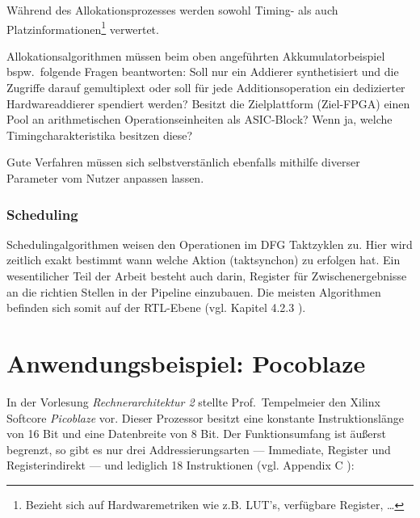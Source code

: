 \documentclass[oneside,a4paper]{article}
\begin{document}
Während des Allokationsprozesses werden sowohl Timing- als auch
Platzinformationen\footnote{Bezieht sich auf Hardwaremetriken wie z.B. LUT's, verfügbare Register, \ldots}
verwertet.

Allokationsalgorithmen müssen beim oben angeführten Akkumulatorbeispiel
bspw.\ folgende Fragen beantworten: Soll nur ein Addierer synthetisiert und die
Zugriffe darauf gemultiplext oder soll für jede Additionsoperation
ein dedizierter Hardwareaddierer spendiert werden? Besitzt die Zielplattform
(Ziel-FPGA) einen Pool an arithmetischen Operationseinheiten als ASIC-Block?
Wenn ja, welche Timingcharakteristika besitzen diese?

Gute Verfahren müssen sich selbstverstänlich ebenfalls mithilfe diverser
Parameter vom Nutzer anpassen lassen.

\subsubsection{Scheduling}
Schedulingalgorithmen weisen den Operationen im DFG Taktzyklen zu.
Hier wird zeitlich exakt bestimmt wann welche Aktion (taktsynchon)
zu erfolgen hat. Ein wesentilicher Teil der Arbeit besteht auch darin,
Register für Zwischenergebnisse an die richtien Stellen in der Pipeline
einzubauen. Die meisten Algorithmen befinden sich
somit auf der RTL-Ebene (vgl. Kapitel 4.2.3 \cite{BLUE}).

\section{Anwendungsbeispiel: Pocoblaze}

In der Vorlesung \emph{Rechnerarchitektur 2} stellte Prof.\ Tempelmeier
den Xilinx Softcore \emph{Picoblaze} vor. Dieser Prozessor besitzt
eine konstante Instruktionslänge von 16 Bit und eine Datenbreite
von 8 Bit. Der Funktionsumfang ist äußerst begrenzt, so gibt es nur
drei Addressierungsarten --- Immediate, Register und Registerindirekt --- und
lediglich 18 Instruktionen (vgl. Appendix C \cite{PICO2004}):
\end{document}
